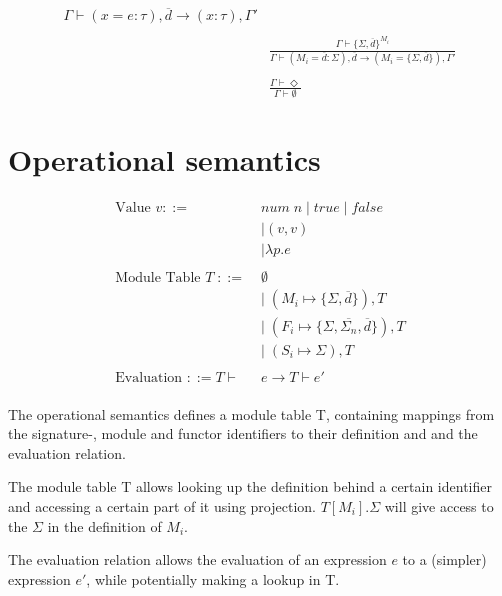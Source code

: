 \documentclass[10pt,a4paper,draft]{article}
\begin{document}
\begin{flushleft}
\begin{align*}
{\Gamma \vdash (x=e:\tau),\overline{d} \rightarrow (x:\tau),\Gamma'} \\
\\
\tag{T-ModBodyM}
&\frac{\Gamma \vdash \lbrace\Sigma, \overline{d} \rbrace^{M_{i}} }
{\Gamma \vdash (\mathit{M_{i}=\overline{d}}:\Sigma),\overline{d} \rightarrow (M_{i}=\lbrace \Sigma,\overline{d} \rbrace),\Gamma'} \\
\\
\tag{T-EmptySet}
&\frac{\Gamma \vdash \Diamond}
{\Gamma \vdash \emptyset}
\end{align*}

\section{Operational semantics}
\begin{align*}
\text{Value }v ::=\;&\mathit{num\;n} \; | \; \mathit{true} \; | \; \mathit{false} \\
&| (v,v) \\
&| \lambda p.e\\
\\
\text{Module Table } T\; ::= \;&\emptyset \\
&| \; (M_{i} \mapsto \lbrace \Sigma,\overline{d}\rbrace), T \\
&| \; (F_{i} \mapsto \lbrace \Sigma, \overline{\Sigma_{n}}, \overline{d} \rbrace), T \\
&| \; (S_{i} \mapsto \Sigma), T\\
\\
\text{Evaluation } ::= T \vdash &e \rightarrow T \vdash e' \\
\end{align*}

The operational semantics defines a module table T, containing mappings from the signature-, module and functor identifiers to their definition and and the evaluation relation. 

The module table T allows looking up the definition behind a certain identifier and accessing a certain part of it using projection. $T[M_{i}].\Sigma$ will give access to the $\Sigma$ in the definition of $M_{i}$. 

The evaluation relation allows the evaluation of an expression $e$ to a (simpler) expression $e'$, while potentially making a lookup in T.


\end{flushleft}
\end{document}
